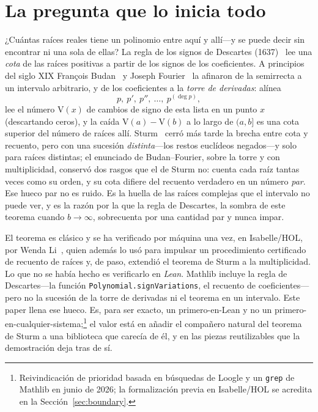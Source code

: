 \documentclass[11pt]{article}
\newcommand{\lean}[1]{\texttt{#1}}
\newcommand{\V}{\mathrm{V}}
\begin{document}
\section{La pregunta que lo inicia todo}\label{sec:intro}

¿Cu\'antas ra\'ices reales tiene un polinomio entre aqu\'i y all\'i---y se puede decir sin encontrar
ni una sola de ellas? La regla de los signos de Descartes (1637)~\cite{descartes} lee una \emph{cota}
de las ra\'ices positivas a partir de los signos de los coeficientes. A principios del siglo XIX
Fran\c{c}ois Budan~\cite{budan} y Joseph Fourier~\cite{fourier} la afinaron de la semirrecta a un
intervalo arbitrario, y de los coeficientes a la \emph{torre de derivadas}: al\'inea
\[
  p,\ p',\ p'',\ \dots,\ p^{(\deg p)},
\]
lee el n\'umero $\V(x)$ de cambios de signo de esta lista en un punto $x$ (descartando ceros), y la
ca\'ida $\V(a)-\V(b)$ a lo largo de $(a,b]$ es una cota superior del n\'umero de ra\'ices all\'i.
Sturm~\cite{sturm} cerr\'o m\'as tarde la brecha entre cota y recuento, pero con una sucesi\'on
\emph{distinta}---los restos eucl\'ideos negados---y solo para ra\'ices distintas; el enunciado de
Budan--Fourier, sobre la torre y con multiplicidad, conserv\'o dos rasgos que el de Sturm no: cuenta
cada ra\'iz tantas veces como su orden, y su cota difiere del recuento verdadero en un n\'umero
\emph{par}. Ese hueco par no es ruido. Es la huella de las ra\'ices complejas que el intervalo no
puede ver, y es la raz\'on por la que la regla de Descartes, la sombra de este teorema cuando
$b\to\infty$, sobrecuenta por una cantidad par y nunca impar.

El teorema es cl\'asico y se ha verificado por m\'aquina una vez, en Isabelle/HOL, por Wenda
Li~\cite{liBF}, quien adem\'as lo us\'o para impulsar un procedimiento certificado de recuento de
ra\'ices y, de paso, extendi\'o el teorema de Sturm a la multiplicidad. Lo que no se hab\'ia hecho es
verificarlo en \emph{Lean}. Mathlib incluye la regla de Descartes---la funci\'on
\lean{Polynomial.signVariations}, el recuento de coeficientes---pero no la sucesi\'on de la torre de
derivadas ni el teorema en un intervalo. Este paper llena ese hueco. Es, para ser exacto, un
primero-en-Lean y no un primero-en-cualquier-sistema;\footnote{Reivindicaci\'on de prioridad basada en
b\'usquedas de Loogle y un \lean{grep} de Mathlib en junio de 2026; la formalizaci\'on previa en
Isabelle/HOL se acredita en la Secci\'on~\ref{sec:boundary}.} el valor est\'a en a\~nadir el
compa\~nero natural del teorema de Sturm a una biblioteca que carec\'ia de \'el, y en las piezas
reutilizables que la demostraci\'on deja tras de s\'i.
\end{document}
